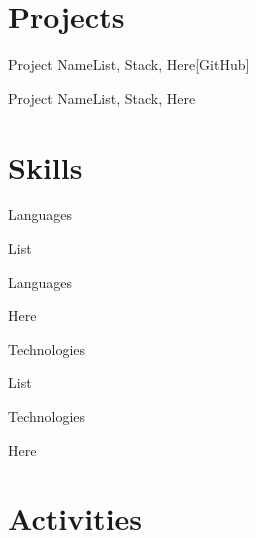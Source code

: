 \documentclass[11pt]{resume}
\begin{document}
\section*{Projects}
\begin{project}{Project Name}{List, Stack, Here}[GitHub]{}
    \item \lipsum[1][10]
    \item \lipsum[1][11]
\end{project}

\begin{project}{Project Name}{List, Stack, Here}{}
    \item \lipsum[1][12]
    \item \lipsum[1][13]
\end{project}



\section*{Skills}
\begin{skills}{Languages}
    \item List
    \item Languages
    \item Here
\end{skills}

\begin{skills}{Technologies}
    \item List
    \item Technologies
    \item Here
\end{skills}



\section*{Activities}



\end{document}
